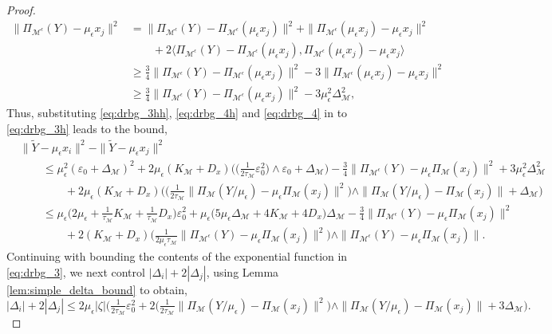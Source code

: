 \documentclass[10pt]{article}
\theoremstyle{plain}
\theoremstyle{definition}
\theoremstyle{remark}
\newcommand{\M}{{\mathcal{M}}}
\newcommand{\Pieps}{\Pi_{\M^\epsilon}}
\newcommand{\gap}{\Delta_\M}
\begin{document}
\begin{proof}
\begin{align}
    \|\Pieps(Y) - \mu_\epsilon x_j\|^2 &= \|\Pieps(Y) - \Pieps(\mu_\epsilon x_j)\|^2 + \|\Pieps(\mu_\epsilon x_j) - \mu_\epsilon x_j\|^2 \nonumber\\
    & \qquad + 2 \langle \Pieps(Y) - \Pieps(\mu_\epsilon x_j), \Pieps(\mu_\epsilon x_j) - \mu_\epsilon x_j \rangle \nonumber\\
    &\geq \frac{3}{4}\|\Pieps(Y) - \Pieps(\mu_\epsilon x_j)\|^2 - 3 \|\Pieps(\mu_\epsilon x_j) - \mu_\epsilon x_j\|^2 \nonumber\\
    &\geq \frac{3}{4}\|\Pieps(Y) - \Pieps(\mu_\epsilon x_j)\|^2 - 3 \mu_\epsilon^2 \gap^2,\label{eq:drbg_4}
\end{align}
Thus, substituting \eqref{eq:drbg_3hh}, \eqref{eq:drbg_4h} and \eqref{eq:drbg_4} in to \eqref{eq:drbg_3h} leads to the bound,
\begin{align}
    &\|\tilde{Y} - \mu_\epsilon x_i\|^2-\|\tilde{Y} - \mu_\epsilon x_j\|^2 \nonumber\\
    & \qquad \leq \mu_\epsilon^2 (\varepsilon_0 + \gap)^2 + 2\mu_\epsilon (K_\M + D_x) \Big ( \big ( \tfrac{1}{2\tau_\M} \varepsilon_0^2 \big ) \wedge \varepsilon_0 + \gap \Big ) - \frac{3}{4} \|\Pieps(Y) - \mu_\epsilon \Pi_\M(x_j)\|^2 + 3 \mu_\epsilon^2 \gap^2 \nonumber\\
    & \qquad \qquad + 2 \mu_\epsilon (K_\M + D_x) \Big ( \big ( \tfrac{1}{2\tau_\M}\|\Pi_\M(Y/\mu_\epsilon) - \mu_\epsilon \Pi_\M(x_j)\|^2 \big ) \wedge \|\Pi_\M(Y/\mu_\epsilon) - \Pi_\M(x_j)\| + \gap \Big ) \nonumber\\
    & \qquad \leq \mu_\epsilon \Big ( 2 \mu_\epsilon + \tfrac{1}{\tau_\M} K_\M + \tfrac{1}{\tau_\M} D_x \Big ) \varepsilon_0^2 + \mu_\epsilon \Big ( 5 \mu_\epsilon \gap + 4 K_\M + 4 D_x \Big ) \gap - \tfrac{3}{4} \|\Pieps(Y) - \mu_\epsilon \Pi_\M(x_j)\|^2 \nonumber \\
    & \qquad \qquad + 2 ( K_\M + D_x) \big ( \tfrac{1}{2 \mu_\epsilon \tau_\M}\|\Pieps(Y) - \mu_\epsilon \Pi_\M(x_j)\|^2 \big ) \wedge \|\Pieps(Y) - \mu_\epsilon \Pi_\M(x_j)\|. \label{eq:drbg_44}
\end{align}
Continuing with bounding the contents of the exponential function in \eqref{eq:drbg_3}, we next control \(|\Delta_i| + 2 |\Delta_j|\), using Lemma \ref{lem:simple_delta_bound} to obtain,
\begin{equation}
    |\Delta_i| + 2 |\Delta_j| \leq 2 \mu_\epsilon |\zeta| \Big ( \tfrac{1}{2\tau_\M} \varepsilon_0^2 + 2 \big ( \tfrac{1}{2\tau_\M} \|\Pi_\M(Y/\mu_\epsilon) - \Pi_\M(x_j) \|^2 \big ) \wedge \|\Pi_\M(Y/\mu_\epsilon) - \Pi_\M(x_j) \|  + 3 \gap \Big ).\label{eq:drbg_5}

\end{equation}
\end{proof}
\end{document}
